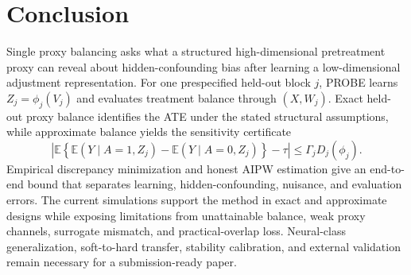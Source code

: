 \section{Conclusion}
\label{sec:conclusion}

Single proxy balancing asks what a structured high-dimensional pretreatment proxy can reveal about hidden-confounding bias after learning a low-dimensional adjustment representation. For one prespecified held-out block $j$, PROBE learns $Z_j=\phi_j(V_j)$ and evaluates treatment balance through $(X,W_j)$. Exact held-out proxy balance identifies the ATE under the stated structural assumptions, while approximate balance yields the sensitivity certificate
\[
\left|\mathbb E\!\left\{\mathbb E(Y\mid A=1,Z_j)-\mathbb E(Y\mid A=0,Z_j)\right\}-\tau\right|
\le\Gamma_jD_j(\phi_j).
\]
Empirical discrepancy minimization and honest AIPW estimation give an end-to-end bound that separates learning, hidden-confounding, nuisance, and evaluation errors. The current simulations support the method in exact and approximate designs while exposing limitations from unattainable balance, weak proxy channels, surrogate mismatch, and practical-overlap loss. Neural-class generalization, soft-to-hard transfer, stability calibration, and external validation remain necessary for a submission-ready paper.
